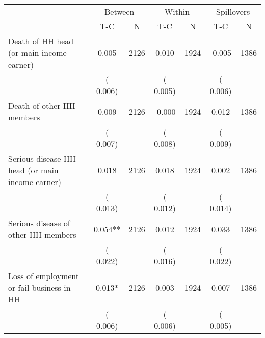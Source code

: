 
\begin{tabular}{l*{6}{c}}\hline&\multicolumn{2}{c}{Between}&\multicolumn{2}{c}{Within}&\multicolumn{2}{c}{Spillovers} \\ \cmidrule(r){2-3}\cmidrule(l){4-5}\cmidrule(l){6-7} & {T-C} & {N} & {T-C} & {N}  & {T-C}  & {N}  \\ \midrule
Death of HH head (or main income earner)        &              0.005      &       2126       &              0.010      &       1924       &             -0.005      &       1386       \\
                       &       (       0.006)            &                               &       (       0.005)            &                               &       (       0.006)            &                               \\
Death of other HH members        &              0.009      &       2126       &             -0.000      &       1924       &              0.012      &       1386       \\
                       &       (       0.007)            &                               &       (       0.008)            &                               &       (       0.009)            &                               \\
Serious disease HH head (or main income earner)        &              0.018      &       2126       &              0.018      &       1924       &              0.002      &       1386       \\
                       &       (       0.013)            &                               &       (       0.012)            &                               &       (       0.014)            &                               \\
Serious disease of other HH members        &              0.054**      &       2126       &              0.012      &       1924       &              0.033      &       1386       \\
                       &       (       0.022)            &                               &       (       0.016)            &                               &       (       0.022)            &                               \\
Loss of employment or fail business in HH        &              0.013*      &       2126       &              0.003      &       1924       &              0.007      &       1386       \\
                       &       (       0.006)            &                               &       (       0.006)            &                               &       (       0.005)            &                               \\

\end{tabular}
